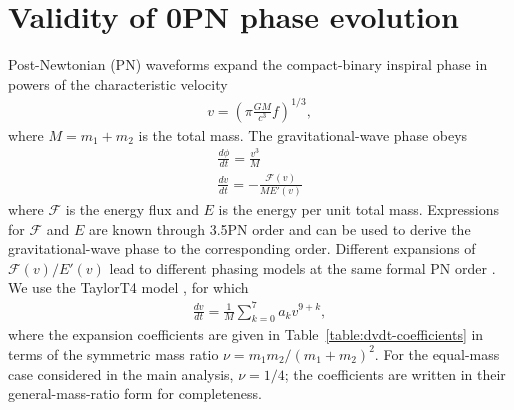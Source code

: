 \documentclass[aps,prd,amsmath,floats,floatfix, twocolumn,
superscriptaddress,nofootinbib,showpacs]{revtex4-2}
\begin{document}
\section{Validity of 0PN phase evolution}
\label{sec:0PN_validity}
Post-Newtonian (PN) waveforms expand the compact-binary inspiral phase in powers of the characteristic velocity
\begin{gather}
    v = \left(\pi \frac{G M}{c^3} f\right)^{1/3},
\end{gather}
where $M=m_1+m_2$ is the total mass.  The gravitational-wave phase obeys
\begin{gather}
    \frac{d\phi}{dt} = \frac{v^3}{M} \\
    \frac{dv}{dt} = -\frac{\mathcal{F}(v)}{ME'(v)} 
\end{gather}
where $\mathcal{F}$ is the energy flux and $E$ is the energy per unit total mass.  Expressions for $\mathcal{F}$ and $E$ are known through 3.5PN order \cite{Faye:2012we} and can be used to derive the gravitational-wave phase to the corresponding order.  Different expansions of $\mathcal{F}(v)/E'(v)$ lead to different phasing models at the same formal PN order \cite{Buonanno:2009zt}.  We use the TaylorT4 model \cite{Buonanno:2002fy}, for which
\begin{gather}
    \frac{dv}{dt} = \frac{1}{M}\sum_{k=0}^{7} a_k v^{9+k} ,
\end{gather}
where the expansion coefficients are given in Table~\ref{table:dvdt-coefficients} in terms of the symmetric mass ratio $\nu = m_1 m_2/(m_1 + m_2)^2$.  For the equal-mass case considered in the main analysis, $\nu=1/4$; the coefficients are written in their general-mass-ratio form for completeness.
\end{document}
